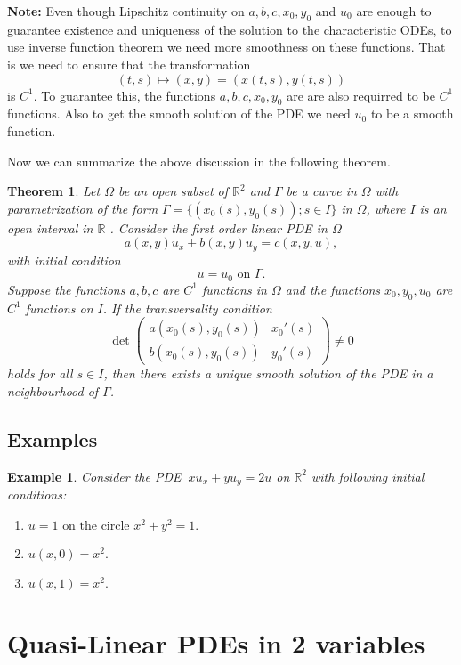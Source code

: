 \documentclass[12pt]{exam}
\newtheorem{theorem}{Theorem}
\newtheorem{example}{Example}
\begin{document}
	\textbf{Note:} Even though Lipschitz continuity on $a,b,c,x_0,y_0$ and $u_0$ are enough to guarantee existence and uniqueness of the solution to the characteristic ODEs, to use inverse function theorem we need more smoothness on these functions. That is we need to ensure that the transformation 
	\[(t,s) \mapsto (x,y) = (x(t,s), y(t,s))\]
	is $C^1$. To guarantee this, the functions \( a, b, c ,x_0,y_0\) are are also requirred to be $C^1$ functions. Also to get the smooth solution of the PDE we need \( u_0 \) to be a smooth function.

	Now we can summarize the above discussion in the following theorem.		

	\begin{theorem}
		Let $\Omega$ be an open subset of $\mathbb{R}^2$ and $\Gamma$ be a curve in $\Omega$ with parametrization of the form $\Gamma=\{(x_0(s),y_0(s));s\in I\}$ in $\Omega$, where $I$ is an open interval in $\mathbb{R}$ . Consider the first order linear PDE in $\Omega$
		\[a(x,y)u_x + b(x,y)u_y = c(x,y,u),\]
		with initial condition
		\[u=u_0 \text{ on } \Gamma.\]
		Suppose the functions \( a, b, c \) are $C^1$ functions in $\Omega$ and the functions \( x_0, y_0, u_0\) are $C^1$ functions on $I$. If the transversality condition
		\[\det \begin{pmatrix}
			a(x_0(s),y_0(s)) & x_0'(s) \\
			b(x_0(s),y_0(s)) & y_0'(s)
			\end{pmatrix} \neq 0\]
		holds for all \( s \in I \), then there exists a unique smooth solution of the PDE in a neighbourhood of $\Gamma$.
	\end{theorem}

	\subsection{Examples}

	\begin{example}
		Consider the PDE $\ xu_x + yu_y = 2u$ on $\mathbb{R}^2$ with following initial conditions:
		\begin{enumerate}
			\item $u = 1 \text{ on the circle } x^2 + y^2 = 1.$
			\item $u(x,0)=x^2.$
			\item $u(x,1)=x^2.$ 
		\end{enumerate}
		
	\end{example}
	

	\section{Quasi-Linear PDEs in 2 variables}
\end{document}
